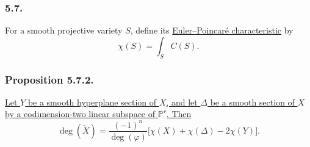 \subsubsection*{5.7.}
For a smooth projective variety $S$, define its
\underline{Euler--Poincaré characteristic} by
\begin{equation}\tag{5.7.1}
\chi(S)=\int_SC(S).
\end{equation}

\subsubsection*{Proposition 5.7.2.}
\underline{Let $Y$ be a smooth hyperplane section of $X$, and let
$\Delta$ be a smooth section of $X$ by a codimension-two linear
subspace of $\mathbb P^r$.  Then}
\begin{equation}\tag{5.7.3}
\deg(\check X)
=\frac{(-1)^n}{\deg(\varphi)}
\bigl[\chi(X)+\chi(\Delta)-2\chi(Y)\bigr].
\end{equation}


